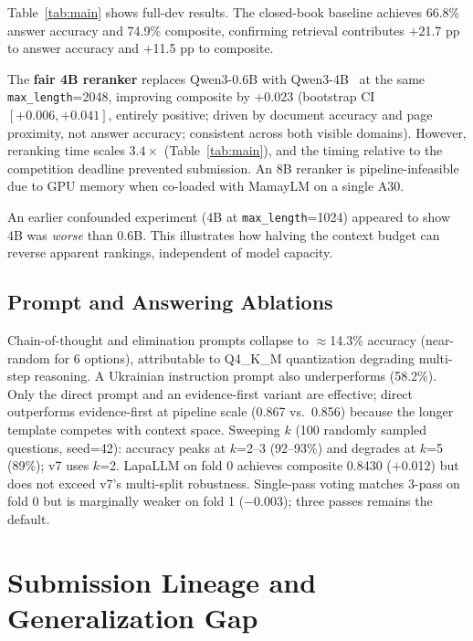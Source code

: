\documentclass[11pt]{article}
\begin{document}
Table~\ref{tab:main} shows full-dev results. The closed-book baseline achieves 66.8\% answer accuracy and 74.9\% composite, confirming retrieval contributes $+$21.7 pp to answer accuracy and $+$11.5 pp to composite.

The \textbf{fair 4B reranker} replaces Qwen3-0.6B with Qwen3-4B~\cite{qwen3_2025} at the same \texttt{max\_length}=2048, improving composite by $+$0.023 (bootstrap CI $[{+}0.006,{+}0.041]$, entirely positive; driven by document accuracy and page proximity, not answer accuracy; consistent across both visible domains). However, reranking time scales $3.4\times$ (Table~\ref{tab:main}), and the timing relative to the competition deadline prevented submission. An 8B reranker is pipeline-infeasible due to GPU memory when co-loaded with MamayLM on a single A30.

An earlier confounded experiment (4B at \texttt{max\_length}=1024) appeared to show 4B was \textit{worse} than 0.6B. This illustrates how halving the context budget can reverse apparent rankings, independent of model capacity.

\subsection{Prompt and Answering Ablations}
\label{sec:prompt}

Chain-of-thought and elimination prompts collapse to $\approx$14.3\% accuracy (near-random for 6 options), attributable to Q4\_K\_M quantization degrading multi-step reasoning. A Ukrainian instruction prompt also underperforms (58.2\%). Only the direct prompt and an evidence-first variant are effective; direct outperforms evidence-first at pipeline scale (0.867 vs.\ 0.856) because the longer template competes with context space. Sweeping $k$ (100 randomly sampled questions, seed=42): accuracy peaks at $k$=2--3 (92--93\%) and degrades at $k$=5 (89\%); v7 uses $k$=2. LapaLLM on fold 0 achieves composite 0.8430 ($+$0.012) but does not exceed v7's multi-split robustness. Single-pass voting matches 3-pass on fold 0 but is marginally weaker on fold 1 ($-$0.003); three passes remains the default.

\section{Submission Lineage and Generalization Gap}
\label{sec:gap}
\end{document}
